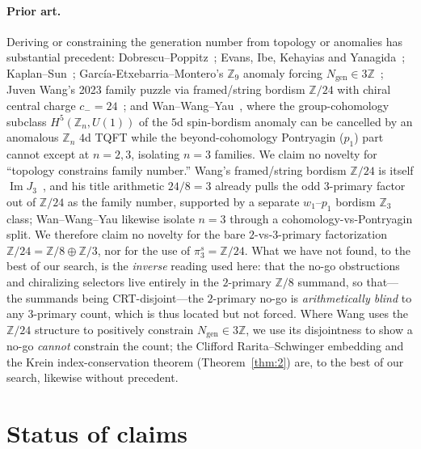 \documentclass[11pt]{article}
\theoremstyle{definition}
\theoremstyle{remark}
\newcommand{\Z}{\mathbb{Z}}
\newcommand{\pis}{\pi_3^{s}}
\newcommand{\Imm}{\operatorname{Im}}
\begin{document}
\paragraph{Prior art.} Deriving or constraining the generation number from topology or anomalies has substantial
precedent: Dobrescu--Poppitz~\cite{dobrescu2001number}; Evans, Ibe, Kehayias and
Yanagida~\cite{evans2012nonanomalous}; Kaplan--Sun~\cite{kaplan2012spacetime};
Garc\'ia-Etxebarria--Montero's $\Z_9$ anomaly forcing $N_{\mathrm{gen}}\in 3\Z$~\cite{garciaetxebarria2019daifreed};
Juven Wang's 2023 family puzzle via framed/string bordism $\Z/24$ with chiral central charge
$c_-=24$~\cite{wang2023family}; and Wan--Wang--Yau~\cite{wan2026fermion}, where the group-cohomology subclass
$H^5(\Z_n,U(1))$ of the $5$d spin-bordism anomaly can be cancelled by an anomalous $\Z_n$ $4$d TQFT while the
beyond-cohomology Pontryagin ($p_1$) part cannot except at $n=2,3$, isolating $n=3$ families. We claim no novelty
for ``topology constrains family number.'' Wang's framed/string bordism $\Z/24$ is itself $\Imm
J_3$~\cite{adams1966jx4}, and his title arithmetic $24/8 = 3$ already pulls the odd $3$-primary factor out of
$\Z/24$ as the family number, supported by a separate $w_1$--$p_1$ bordism $\Z_3$ class; Wan--Wang--Yau likewise
isolate $n=3$ through a cohomology-vs-Pontryagin split. We therefore claim no novelty for the bare
$2$-vs-$3$-primary factorization $\Z/24 = \Z/8 \oplus \Z/3$, nor for the use of $\pis = \Z/24$. What we have not
found, to the best of our search, is the \emph{inverse} reading used here: that the no-go obstructions and
chiralizing selectors live entirely in the $2$-primary $\Z/8$ summand, so that---the summands being
CRT-disjoint---the $2$-primary no-go is \emph{arithmetically blind} to any $3$-primary count, which is thus
located but not forced. Where Wang uses the $\Z/24$ structure to positively constrain $N_{\mathrm{gen}}\in 3\Z$,
we use its disjointness to show a no-go \emph{cannot} constrain the count; the Clifford Rarita--Schwinger
embedding and the Krein index-conservation theorem (Theorem~\ref{thm:2}) are, to the best of our search,
likewise without precedent.

\section{Status of claims}\label{sec:status}
\end{document}
